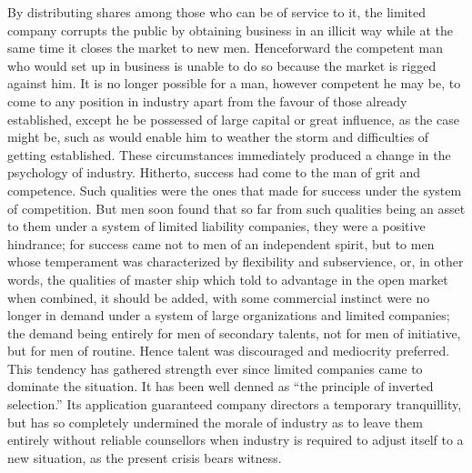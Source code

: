 \documentclass{book}
\begin{document}
By distributing shares among those who can be of service to it, the limited company corrupts the public by obtaining business in an illicit way while at the same time it closes the market to new men. Henceforward the competent man who would set up in business is unable to do so because the market is rigged against him. It is no longer possible for a man, however competent he may be, to come to any position in industry apart from the favour of those already established, except he be possessed of large capital or great influence, as the case might be, such as would enable him to weather the storm and difficulties of getting established. These circumstances immediately produced a change in the psychology of industry. Hitherto, success had come to the man of grit and competence. Such qualities were the ones that made for success under the system of competition. But men soon found that so far from such qualities being an asset to them under a system of limited liability companies, they were a positive hindrance; for success came not to men of an independent spirit, but to men whose temperament was characterized by flexibility and subservience, or, in other words, the qualities of master ship which told to advantage in the open market when combined, it should be added, with some commercial instinct were no longer in demand under a system of large organizations and limited companies; the demand being entirely for men of secondary talents, not for men of initiative, but for men of routine. Hence talent was discouraged and mediocrity preferred. This tendency has gathered strength ever since limited companies came to dominate the situation. It has been well denned as “the principle of inverted selection.” Its application guaranteed company directors a temporary tranquillity, but has so completely undermined the morale of industry as to leave them entirely without reliable counsellors when industry is required to adjust itself to a new situation, as the present crisis bears witness.
\end{document}
